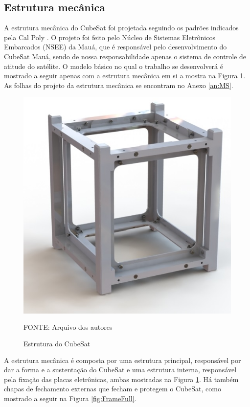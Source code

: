 \documentclass[
	12pt,				%
	openany,			%
	twoside,			%
	a4paper,			%
	english,			%
	french,				%
	spanish,			%
	brazil,				%
	oldfontcommands
	]{abntex2}
\begin{document}

\subsection{Estrutura mecânica}

A estrutura mecânica do CubeSat foi projetada seguindo os padrões indicados pela Cal Poly \cite{CalPoly}. O projeto foi feito pelo Núcleo de Sistemas Eletrônicos Embarcados (NSEE) da Mauá, que é responsável pelo desenvolvimento do CubeSat Mauá, sendo de nossa responsabilidade apenas o sistema de controle de atitude do satélite. O modelo básico no qual o trabalho se desenvolverá é mostrado a seguir apenas com a estrutura mecânica em si a mostra na Figura \ref{fig:Frame}. As folhas do projeto da estrutura mecânica se encontram no Anexo \ref{an:MS}.

\begin{figure}[th]
	\caption{Estrutura do CubeSat}
	\centering
	\includegraphics[width=0.7\linewidth]{./figs/Frame}
	
	\begin{small}
		FONTE: Arquivo dos autores
	\end{small}
	\label{fig:Frame}
\end{figure}

\newpage

A estrutura mecânica é composta por uma estrutura principal, responsável por dar a forma e a sustentação do CubeSat e uma estrutura interna, responsável pela fixação das placas eletrônicas, ambas mostradas na Figura \ref{fig:Frame}. Há também chapas de fechamento externas que fecham e protegem o CubeSat, como mostrado a seguir na Figura \ref{fig:FrameFull}.
\end{document}
